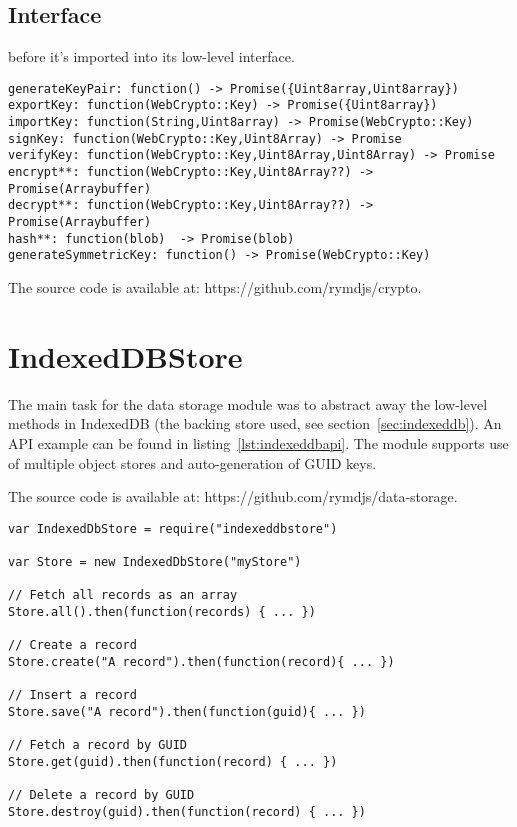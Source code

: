 \subsection{Interface}
before it's imported into its low-level interface. %
\begin{Code}
\begin{lstlisting}[caption={Common database operations}, label={lst:cryptointerface}]
generateKeyPair: function() -> Promise({Uint8array,Uint8array})
exportKey: function(WebCrypto::Key) -> Promise({Uint8array})
importKey: function(String,Uint8array) -> Promise(WebCrypto::Key)
signKey: function(WebCrypto::Key,Uint8Array) -> Promise
verifyKey: function(WebCrypto::Key,Uint8Array,Uint8Array) -> Promise
encrypt**: function(WebCrypto::Key,Uint8Array??) -> Promise(Arraybuffer)
decrypt**: function(WebCrypto::Key,Uint8Array??) -> Promise(Arraybuffer)
hash**: function(blob)  -> Promise(blob)
generateSymmetricKey: function() -> Promise(WebCrypto::Key)
\end{lstlisting}
\end{Code}

The source code is available at: https://github.com/rymdjs/crypto.

\section{IndexedDBStore}
\label{sec:indexeddbstore}

The main task for the data storage module was to abstract away the low-level methods in IndexedDB (the backing store used, see section~\ref{sec:indexeddb}). An API example can be found in listing~\ref{lst:indexeddbapi}. The module supports use of multiple object stores and auto-generation of GUID keys.

The source code is available at: https://github.com/rymdjs/data-storage.

\begin{Code}
\begin{lstlisting}[caption={Common database operations}, label={lst:indexeddbapi}]
var IndexedDbStore = require("indexeddbstore")

var Store = new IndexedDbStore("myStore")

// Fetch all records as an array
Store.all().then(function(records) { ... })

// Create a record
Store.create("A record").then(function(record){ ... })

// Insert a record
Store.save("A record").then(function(guid){ ... })

// Fetch a record by GUID
Store.get(guid).then(function(record) { ... })

// Delete a record by GUID
Store.destroy(guid).then(function(record) { ... })
\end{lstlisting}
\end{Code}

